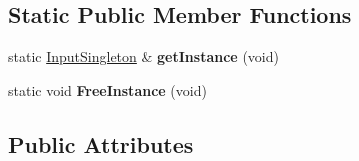 \subsection*{Static Public Member Functions}
\begin{DoxyCompactItemize}
\item 
\mbox{\label{class_input_singleton_ad01893e0ca9ace6c8c32348057c0c863}} 
static \hyperlink{class_input_singleton}{Input\+Singleton} \& {\bfseries get\+Instance} (void)
\item 
\mbox{\label{class_input_singleton_a6d31594eeeb97d9cd5ad93e2f7e5a405}} 
static void {\bfseries Free\+Instance} (void)
\end{DoxyCompactItemize}
\subsection*{Public Attributes}
